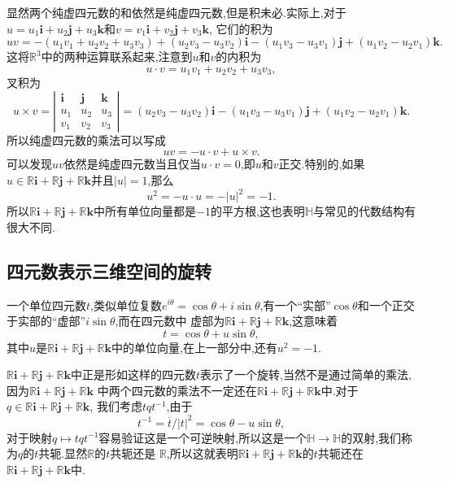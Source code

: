 \documentclass[10pt,a4paper]{ctexbook}
\theoremstyle{definition}
\begin{document}
显然两个纯虚四元数的和依然是纯虚四元数,但是积未必.实际上,对于$u=u_1\mathbf{i}+u_2\mathbf{j}+u_3\mathbf{k}$和$v=v_1\mathbf{i}+v_2\mathbf{j}+v_3\mathbf{k}$,
它们的积为
\[
    uv=-(u_1v_1+u_2v_2+u_3v_3)+(u_2v_3-u_3v_2)\mathbf{i}-(u_1v_3-u_3v_1)\mathbf{j}+(u_1v_2-u_2v_1)\mathbf{k}.
\]
这将$\mathbb{R}^3$中的两种运算联系起来,注意到$u$和$v$的内积为
\[
    u\cdot v=u_1v_1+u_2v_2+u_3v_3,
\]
叉积为
\[
    u\times v =\left|\begin{matrix}
        \mathbf{i} & \mathbf{j} & \mathbf{k} \\
        u_1 & u_2 & u_3 \\
        v_1 & v_2 & v_3 
    \end{matrix}\right|=(u_2v_3-u_3v_2)\mathbf{i}-(u_1v_3-u_3v_1)\mathbf{j}+(u_1v_2-u_2v_1)\mathbf{k}.
\]
所以纯虚四元数的乘法可以写成
\begin{equation}
    uv=-u\cdot v+u\times v.\label{multiply}
\end{equation}
可以发现$uv$依然是纯虚四元数当且仅当$u\cdot v=0$,即$u$和$v$正交.特别的,如果$u\in\mathbb{R}\mathbf{i}+\mathbb{R}\mathbf{j}+\mathbb{R}\mathbf{k}$并且$|u|=1$,那么
\[
    u^2=-u\cdot u=-|u|^2=-1.
\]
所以$\mathbb{R}\mathbf{i}+\mathbb{R}\mathbf{j}+\mathbb{R}\mathbf{k}$中所有单位向量都是$-1$的平方根,这也表明$\mathbb{H}$与常见的代数结构有很大不同.

\subsection{四元数表示三维空间的旋转}

一个单位四元数$t$,类似单位复数$e^{i\theta}=\cos\theta+i\sin\theta$,有一个``实部''$\cos\theta$和一个正交于实部的``虚部''$i\sin\theta$,而在四元数中%
虚部为$\mathbb{R}\mathbf{i}+\mathbb{R}\mathbf{j}+\mathbb{R}\mathbf{k}$,这意味着
\[
    t=\cos\theta +u\sin\theta,
\]
其中$u$是$\mathbb{R}\mathbf{i}+\mathbb{R}\mathbf{j}+\mathbb{R}\mathbf{k}$中的单位向量,在上一部分中,还有$u^2=-1$.

$\mathbb{R}\mathbf{i}+\mathbb{R}\mathbf{j}+\mathbb{R}\mathbf{k}$中正是形如这样的四元数$t$表示了一个旋转,当然不是通过简单的乘法,因为$\mathbb{R}\mathbf{i}+\mathbb{R}\mathbf{j}+\mathbb{R}\mathbf{k}$%
中两个四元数的乘法不一定还在$\mathbb{R}\mathbf{i}+\mathbb{R}\mathbf{j}+\mathbb{R}\mathbf{k}$中.对于$q\in\mathbb{R}\mathbf{i}+\mathbb{R}\mathbf{j}+\mathbb{R}\mathbf{k}$,%
我们考虑$tqt^{-1}$,由于
\[
    t^{-1}=\overline{t}/|t|^2=\cos\theta-u\sin\theta,
\]
对于映射$q\mapsto tqt^{-1}$容易验证这是一个可逆映射,所以这是一个$\mathbb{H}\to \mathbb{H}$的双射,我们称为$q$的$t$共轭.显然$\mathbb{R}$的$t$共轭还是%
$\mathbb{R}$,所以这就表明$\mathbb{R}\mathbf{i}+\mathbb{R}\mathbf{j}+\mathbb{R}\mathbf{k}$的$t$共轭还在$\mathbb{R}\mathbf{i}+\mathbb{R}\mathbf{j}+\mathbb{R}\mathbf{k}$中.
\end{document}
